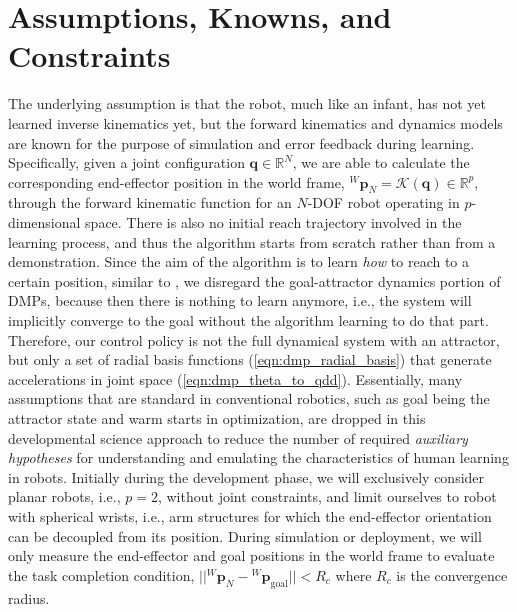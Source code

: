 \documentclass[10pt]{article}
\begin{document}
\section{Assumptions, Knowns, and Constraints}
The underlying assumption is that the robot, much like an infant, has not yet learned inverse kinematics yet, but the forward kinematics and dynamics models are known for the purpose of simulation and error feedback during learning. Specifically, given a joint configuration $\mathbf{q} \in \mathbb{R}^N$, we are able to calculate the corresponding end-effector position in the world frame, ${^W}\mathbf{p}_N = \mathcal{K}(\mathbf{q}) \in \mathbb{R}^p$, through the forward kinematic function for an $N$-DOF robot operating in $p$-dimensional space. There is also no initial reach trajectory involved in the learning process, and thus the algorithm starts from scratch rather than from a demonstration. Since the aim of the algorithm is to learn \emph{how} to reach to a certain position, similar to \cite{pdff}, we disregard the goal-attractor dynamics portion of DMPs, because then there is nothing to learn anymore, i.e., the system will implicitly converge to the goal without the algorithm learning to do that part. Therefore, our control policy is not the full dynamical system with an attractor, but only a set of radial basis functions (\ref{eqn:dmp_radial_basis}) that generate accelerations in joint space (\ref{eqn:dmp_theta_to_qdd}). Essentially, many assumptions that are standard in conventional robotics, such as goal being the attractor state and warm starts in optimization, are dropped in this developmental science approach to reduce the number of required \emph{auxiliary hypotheses} for understanding and emulating the characteristics of human learning in robots. Initially during the development phase, we will exclusively consider planar robots, i.e., $p=2$, without joint constraints, and limit ourselves to robot with spherical wrists, i.e., arm structures for which the end-effector orientation can be decoupled from its position. During simulation or deployment, we will only measure the end-effector and goal positions in the world frame to evaluate the task completion condition, $||{^W\mathbf{p}_N} - {^W}\mathbf{p}_{\text{goal}}|| < R_c$ where $R_c$ is the convergence radius.
\end{document}
